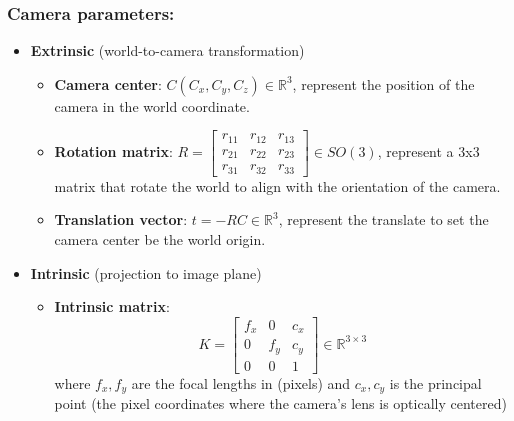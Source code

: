\documentclass[12pt]{article}
\begin{document}
\subsubsection*{Camera parameters:}
\begin{itemize}
    \item \textbf{Extrinsic} (world-to-camera transformation)
        \begin{itemize}
            \item \textbf{Camera center}: $C(C_x, C_y, C_z) \in \mathbb{R}^3$, represent the position of the camera in the world coordinate.
            \item \textbf{Rotation matrix}: $R = 
                \begin{bmatrix}
                    r_{11} & r_{12} & r_{13} \\
                    r_{21} & r_{22} & r_{23} \\
                    r_{31} & r_{32} & r_{33}
                \end{bmatrix}
                \in SO(3)$, represent a 3x3 matrix that rotate the world to align with the orientation of the camera.
            \item \textbf{Translation vector}: $t = -RC \in \mathbb{R}^3$, represent the translate to set the camera center be the world origin.
        \end{itemize}
    \item \textbf{Intrinsic} (projection to image plane)
        \begin{itemize}
            \item \textbf{Intrinsic matrix}: 
                \[
                    K = \begin{bmatrix}
                    f_x & 0 & c_x \\
                    0 & f_y & c_y \\ 
                    0 & 0 & 1
                    \end{bmatrix} \in \mathbb{R}^{3 \times 3}
                \]
            where \(f_x, f_y\) are the focal lengths in (pixels) and \(c_x, c_y\) is the principal point (the pixel coordinates where the camera's lens is optically centered)
        \end{itemize}
\end{itemize}
\end{document}
